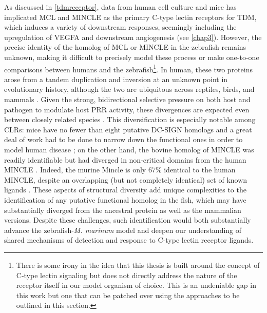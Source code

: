 As discussed in \autoref{tdmreceptor}, data from human cell culture and mice has implicated MCL and MINCLE as the primary C\hyp{}type lectin receptors for TDM, which induces a variety of downstream responses, seemingly including the upregulation of VEGFA and downstream angiogenesis (see \autoref{chap3}). However, the precise identity of the homolog of MCL or MINCLE in the zebrafish remains unknown, making it difficult to precisely model these process or make one\hyp{}to\hyp{}one comparisons between humans and the zebrafish\footnote{There is some irony in the idea that this thesis is built around the concept of C\hyp{}type lectin signaling but does not directly address the nature of the receptor itself in our model organism of choice. This is an undeniable gap in this work but one that can be patched over using the approaches to be outlined in this section.}. In human, these two proteins arose from a tandem duplication and inversion at an unknown point in evolutionary history, although the two are ubiquitous across reptiles, birds, and mammals \citep{Miyake2013, Richardson2014}. Given the strong, bidirectional selective pressure on both host and pathogen to modulate host PRR activity, these divergences are expected even between closely related species \citep{Rambaruth2015}. This diversification is especially notable among CLRs: mice have no fewer than eight putative DC\hyp{}SIGN homologs and a great deal of work had to be done to narrow down the functional ones in order to model human disease \citep{GarciaVallejo2013}; on the other hand, the bovine homolog of MINCLE was readily identifiable but had diverged in non\hyp{}critical domains from the human MINCLE \citep{Furukawa2013, Feinberg2013, Feinberg2016}. Indeed, the murine Mincle is only 67\% identical to the human MINCLE, despite an overlapping (but not completely identical) set of known ligands \citep{Matsumoto1999}. These aspects of structural diversity add unique complexities to the identification of any putative functional homolog in the fish, which may have substantially diverged from the ancestral protein as well as the mammalian versions. Despite these challenges, such identification would both substantially advance the zebrafish\hyp{}\textit{M. marinum} model and deepen our understanding of shared mechanisms of detection and response to C\hyp{}type lectin receptor ligands.

